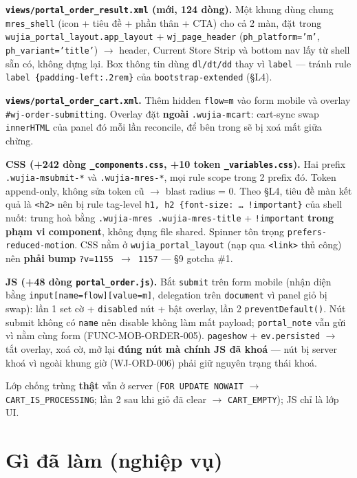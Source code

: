 \textbf{\texttt{views/portal\_order\_result.xml} (mới, 124 dòng).} Một khung dùng chung
\texttt{mres\_shell} (icon + tiêu đề + phần thân + CTA) cho cả 2 màn, đặt trong
\texttt{wujia\_portal\_layout.app\_layout} + \texttt{wj\_page\_header}
(\texttt{ph\_platform='m'}, \texttt{ph\_variant='title'}) $\to$ header, Current Store Strip và
bottom nav lấy từ shell sẵn có, không dựng lại. Box thông tin dùng \texttt{dl/dt/dd} thay vì
\texttt{label} --- tránh rule \texttt{label \{padding-left:.2rem\}} của \texttt{bootstrap-extended}
(§L4).

\textbf{\texttt{views/portal\_order\_cart.xml}.} Thêm hidden \texttt{flow=m} vào form mobile và
overlay \texttt{\#wj-order-submitting}. Overlay đặt \textbf{ngoài} \texttt{.wujia-mcart}: cart-sync
swap \texttt{innerHTML} của panel đó mỗi lần reconcile, để bên trong sẽ bị xoá mất giữa chừng.

\textbf{CSS (+242 dòng \texttt{\_components.css}, +10 token \texttt{\_variables.css}).} Hai prefix
\texttt{.wujia-msubmit-*} và \texttt{.wujia-mres-*}, mọi rule scope trong 2 prefix đó. Token
append-only, không sửa token cũ $\to$ blast radius = 0. Theo §L4, tiêu đề màn kết quả là
\texttt{<h2>} nên bị rule tag-level \texttt{h1, h2 \{font-size: … !important\}} của shell nuốt:
trung hoà bằng \texttt{.wujia-mres .wujia-mres-title} + \texttt{!important}
\textbf{trong phạm vi component}, không đụng file shared. Spinner tôn trọng
\texttt{prefers-reduced-motion}. CSS nằm ở \texttt{wujia\_portal\_layout} (nạp qua \texttt{<link>}
thủ công) nên \textbf{phải bump} \texttt{?v=1155 $\to$ 1157} --- §9 gotcha \#1.

\textbf{JS (+48 dòng \texttt{portal\_order.js}).} Bắt \texttt{submit} trên form mobile (nhận diện
bằng \texttt{input[name=flow][value=m]}, delegation trên \texttt{document} vì panel giỏ bị swap):
lần 1 set cờ + \texttt{disabled} nút + bật overlay, lần 2 \texttt{preventDefault()}. Nút submit
không có \texttt{name} nên disable không làm mất payload; \texttt{portal\_note} vẫn gửi vì nằm cùng
form (FUNC-MOB-ORDER-005). \texttt{pageshow} + \texttt{ev.persisted} $\to$ tắt overlay, xoá cờ, mở
lại \textbf{đúng nút mà chính JS đã khoá} --- nút bị server khoá vì ngoài khung giờ (WJ-ORD-006)
phải giữ nguyên trạng thái khoá.

Lớp chống trùng \textbf{thật} vẫn ở server (\texttt{FOR UPDATE NOWAIT} $\to$
\texttt{CART\_IS\_PROCESSING}; lần 2 sau khi giỏ đã clear $\to$ \texttt{CART\_EMPTY}); JS chỉ là
lớp UI.

\section{Gì đã làm (nghiệp vụ)}

